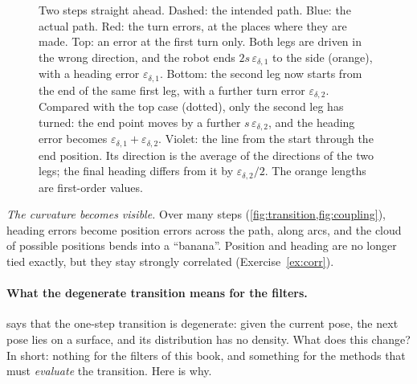 \begin{figure}[ht]
\caption{Two steps straight ahead. Dashed: the intended path. Blue: the
actual path. Red: the turn errors, at the places where they are made. Top:
an error at the first turn only. Both legs are driven in the wrong
direction, and the robot ends $2s\,\varepsilon_{\delta,1}$ to the side
(orange), with a heading error $\varepsilon_{\delta,1}$. Bottom: the
second leg now starts from the end of the same first leg, with a further
turn error $\varepsilon_{\delta,2}$. Compared with the top case (dotted),
only the second leg has turned: the end point moves by a further
$s\,\varepsilon_{\delta,2}$, and the heading error becomes
$\varepsilon_{\delta,1}+\varepsilon_{\delta,2}$. Violet: the line from the
start through the end position. Its direction is the average of the
directions of the two legs; the final heading differs from it by
$\varepsilon_{\delta,2}/2$. The orange lengths are first-order values.}
\label{fig:twolegs}
\end{figure}

\emph{The curvature becomes visible.} Over many steps
(\cref{fig:transition,fig:coupling}), heading errors become position
errors across the path, along arcs, and the cloud of possible positions
bends into a ``banana''. Position and heading are no longer tied exactly,
but they stay strongly correlated (Exercise~\ref{ex:corr}).

\paragraph{What the degenerate transition means for the filters.}
 says that the one-step transition is degenerate:
given the current pose, the next pose lies on a surface, and its
distribution has no density. What does this change? In short: nothing
for the filters of this book, and something for the methods that must
\emph{evaluate} the transition. Here is why.

